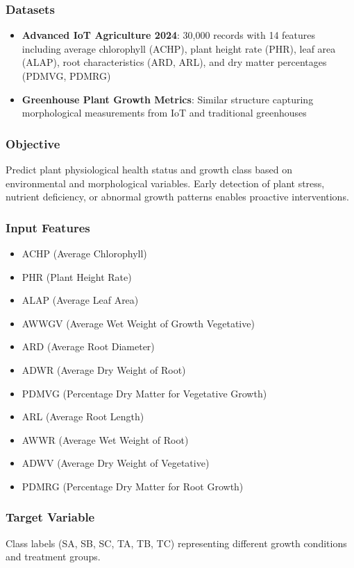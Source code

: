 \documentclass[conference]{IEEEtran}
\begin{document}
\subsubsection{Datasets}
\begin{itemize}
\item \textbf{Advanced IoT Agriculture 2024}: 30,000 records with 14 features including average chlorophyll (ACHP), plant height rate (PHR), leaf area (ALAP), root characteristics (ARD, ARL), and dry matter percentages (PDMVG, PDMRG)
\item \textbf{Greenhouse Plant Growth Metrics}: Similar structure capturing morphological measurements from IoT and traditional greenhouses
\end{itemize}

\subsubsection{Objective}
Predict plant physiological health status and growth class based on environmental and morphological variables. Early detection of plant stress, nutrient deficiency, or abnormal growth patterns enables proactive interventions.

\subsubsection{Input Features}
\begin{itemize}
\item ACHP (Average Chlorophyll)
\item PHR (Plant Height Rate)
\item ALAP (Average Leaf Area)
\item AWWGV (Average Wet Weight of Growth Vegetative)
\item ARD (Average Root Diameter)
\item ADWR (Average Dry Weight of Root)
\item PDMVG (Percentage Dry Matter for Vegetative Growth)
\item ARL (Average Root Length)
\item AWWR (Average Wet Weight of Root)
\item ADWV (Average Dry Weight of Vegetative)
\item PDMRG (Percentage Dry Matter for Root Growth)
\end{itemize}

\subsubsection{Target Variable}
Class labels (SA, SB, SC, TA, TB, TC) representing different growth conditions and treatment groups.
\end{document}
